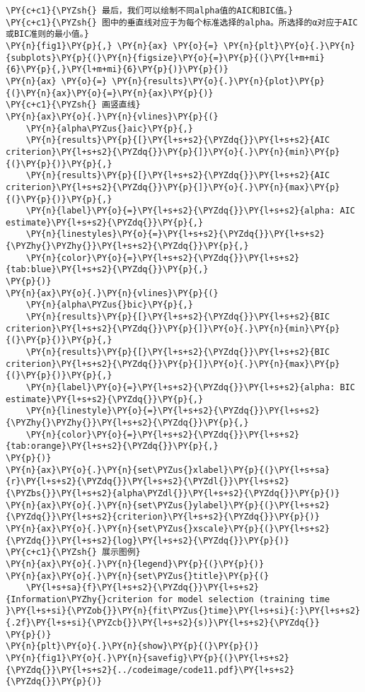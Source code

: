 \begin{Verbatim}[commandchars=\\\{\}]
\PY{c+c1}{\PYZsh{} 最后，我们可以绘制不同alpha值的AIC和BIC值。}
\PY{c+c1}{\PYZsh{} 图中的垂直线对应于为每个标准选择的alpha。所选择的α对应于AIC或BIC准则的最小值。}
\PY{n}{fig1}\PY{p}{,} \PY{n}{ax} \PY{o}{=} \PY{n}{plt}\PY{o}{.}\PY{n}{subplots}\PY{p}{(}\PY{n}{figsize}\PY{o}{=}\PY{p}{(}\PY{l+m+mi}{6}\PY{p}{,}\PY{l+m+mi}{6}\PY{p}{)}\PY{p}{)}
\PY{n}{ax} \PY{o}{=} \PY{n}{results}\PY{o}{.}\PY{n}{plot}\PY{p}{(}\PY{n}{ax}\PY{o}{=}\PY{n}{ax}\PY{p}{)}
\PY{c+c1}{\PYZsh{} 画竖直线}
\PY{n}{ax}\PY{o}{.}\PY{n}{vlines}\PY{p}{(}
    \PY{n}{alpha\PYZus{}aic}\PY{p}{,}
    \PY{n}{results}\PY{p}{[}\PY{l+s+s2}{\PYZdq{}}\PY{l+s+s2}{AIC criterion}\PY{l+s+s2}{\PYZdq{}}\PY{p}{]}\PY{o}{.}\PY{n}{min}\PY{p}{(}\PY{p}{)}\PY{p}{,}
    \PY{n}{results}\PY{p}{[}\PY{l+s+s2}{\PYZdq{}}\PY{l+s+s2}{AIC criterion}\PY{l+s+s2}{\PYZdq{}}\PY{p}{]}\PY{o}{.}\PY{n}{max}\PY{p}{(}\PY{p}{)}\PY{p}{,}
    \PY{n}{label}\PY{o}{=}\PY{l+s+s2}{\PYZdq{}}\PY{l+s+s2}{alpha: AIC estimate}\PY{l+s+s2}{\PYZdq{}}\PY{p}{,}
    \PY{n}{linestyles}\PY{o}{=}\PY{l+s+s2}{\PYZdq{}}\PY{l+s+s2}{\PYZhy{}\PYZhy{}}\PY{l+s+s2}{\PYZdq{}}\PY{p}{,}
    \PY{n}{color}\PY{o}{=}\PY{l+s+s2}{\PYZdq{}}\PY{l+s+s2}{tab:blue}\PY{l+s+s2}{\PYZdq{}}\PY{p}{,}
\PY{p}{)}
\PY{n}{ax}\PY{o}{.}\PY{n}{vlines}\PY{p}{(}
    \PY{n}{alpha\PYZus{}bic}\PY{p}{,}
    \PY{n}{results}\PY{p}{[}\PY{l+s+s2}{\PYZdq{}}\PY{l+s+s2}{BIC criterion}\PY{l+s+s2}{\PYZdq{}}\PY{p}{]}\PY{o}{.}\PY{n}{min}\PY{p}{(}\PY{p}{)}\PY{p}{,}
    \PY{n}{results}\PY{p}{[}\PY{l+s+s2}{\PYZdq{}}\PY{l+s+s2}{BIC criterion}\PY{l+s+s2}{\PYZdq{}}\PY{p}{]}\PY{o}{.}\PY{n}{max}\PY{p}{(}\PY{p}{)}\PY{p}{,}
    \PY{n}{label}\PY{o}{=}\PY{l+s+s2}{\PYZdq{}}\PY{l+s+s2}{alpha: BIC estimate}\PY{l+s+s2}{\PYZdq{}}\PY{p}{,}
    \PY{n}{linestyle}\PY{o}{=}\PY{l+s+s2}{\PYZdq{}}\PY{l+s+s2}{\PYZhy{}\PYZhy{}}\PY{l+s+s2}{\PYZdq{}}\PY{p}{,}
    \PY{n}{color}\PY{o}{=}\PY{l+s+s2}{\PYZdq{}}\PY{l+s+s2}{tab:orange}\PY{l+s+s2}{\PYZdq{}}\PY{p}{,}
\PY{p}{)}
\PY{n}{ax}\PY{o}{.}\PY{n}{set\PYZus{}xlabel}\PY{p}{(}\PY{l+s+sa}{r}\PY{l+s+s2}{\PYZdq{}}\PY{l+s+s2}{\PYZdl{}}\PY{l+s+s2}{\PYZbs{}}\PY{l+s+s2}{alpha\PYZdl{}}\PY{l+s+s2}{\PYZdq{}}\PY{p}{)}
\PY{n}{ax}\PY{o}{.}\PY{n}{set\PYZus{}ylabel}\PY{p}{(}\PY{l+s+s2}{\PYZdq{}}\PY{l+s+s2}{criterion}\PY{l+s+s2}{\PYZdq{}}\PY{p}{)}
\PY{n}{ax}\PY{o}{.}\PY{n}{set\PYZus{}xscale}\PY{p}{(}\PY{l+s+s2}{\PYZdq{}}\PY{l+s+s2}{log}\PY{l+s+s2}{\PYZdq{}}\PY{p}{)}
\PY{c+c1}{\PYZsh{} 展示图例}
\PY{n}{ax}\PY{o}{.}\PY{n}{legend}\PY{p}{(}\PY{p}{)}
\PY{n}{ax}\PY{o}{.}\PY{n}{set\PYZus{}title}\PY{p}{(}
    \PY{l+s+sa}{f}\PY{l+s+s2}{\PYZdq{}}\PY{l+s+s2}{Information\PYZhy{}criterion for model selection (training time }\PY{l+s+si}{\PYZob{}}\PY{n}{fit\PYZus{}time}\PY{l+s+si}{:}\PY{l+s+s2}{.2f}\PY{l+s+si}{\PYZcb{}}\PY{l+s+s2}{s)}\PY{l+s+s2}{\PYZdq{}}
\PY{p}{)}
\PY{n}{plt}\PY{o}{.}\PY{n}{show}\PY{p}{(}\PY{p}{)}
\PY{n}{fig1}\PY{o}{.}\PY{n}{savefig}\PY{p}{(}\PY{l+s+s2}{\PYZdq{}}\PY{l+s+s2}{../codeimage/code11.pdf}\PY{l+s+s2}{\PYZdq{}}\PY{p}{)}
\end{Verbatim}
